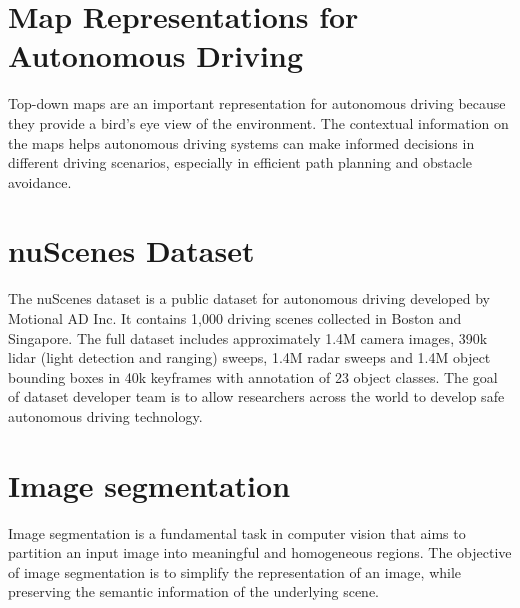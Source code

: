 \section{Map Representations for Autonomous Driving}

Top-down maps are an important representation for autonomous driving because they provide a bird's eye view of the environment. The contextual information on the maps helps autonomous driving systems can make informed decisions in different driving scenarios, especially in efficient path planning and obstacle avoidance. 


\section{nuScenes Dataset}

The nuScenes dataset is a public dataset for autonomous driving developed by Motional AD Inc. It contains 1,000 driving scenes collected in Boston and Singapore. The full dataset includes approximately 1.4M camera images, 390k lidar (light detection and ranging) sweeps, 1.4M radar sweeps and 1.4M object bounding boxes in 40k keyframes with annotation of 23 object classes. The goal of dataset developer team is to allow researchers across the world to develop safe autonomous driving technology. \cite{nuscenes2019}


\section{Image segmentation}

Image segmentation is a fundamental task in computer vision that aims to partition an input image into meaningful and homogeneous regions. The objective of image segmentation is to simplify the representation of an image, while preserving the semantic information of the underlying scene.